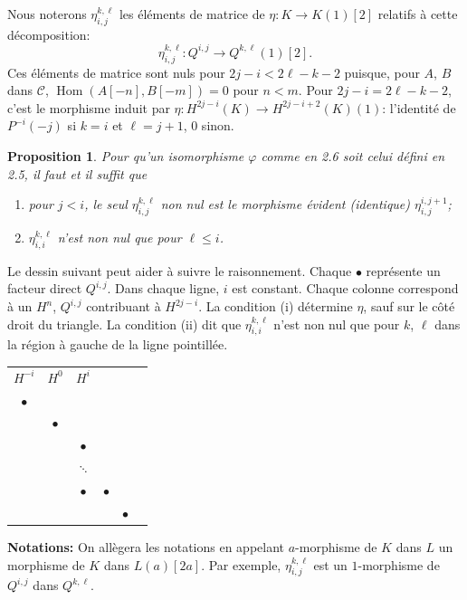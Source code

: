 \documentclass[11pt,a4paper]{article}
\theoremstyle{plain}
\newtheorem{proposition}[theorem]{Proposition}
\theoremstyle{definition}
\DeclareMathOperator{\Hom}{Hom}
\newcommand{\cC}{\mathscr{C}}
\begin{document}
Nous noterons $\eta^{k,\ell}_{i,j}$ les \'el\'ements de matrice de $\eta \colon K \to K(1)[2]$ relatifs \`a cette d\'ecomposition:
\[
\eta^{k,\ell}_{i,j} \colon Q^{i,j} \to Q^{k,\ell}(1)[2].
\]
Ces \'el\'ements de matrice sont nuls pour $2j-i < 2\ell-k-2$ puisque, pour $A$, $B$ dans $\cC$, $\Hom(A[-n], B[-m]) = 0$ pour $n < m$. Pour $2j-i = 2\ell-k-2$, c'est le morphisme induit par $\eta \colon H^{2j-i}(K) \to H^{2j-i+2}(K)(1)$: l'identit\'e de $P^{-i}(-j)$ si $k=i$ et $\ell=j+1$, $0$ sinon.

\begin{proposition}\label{prop:2.7}
Pour qu'un isomorphisme $\varphi$ comme en \emph{2.6} soit celui d\'efini en \emph{2.5}, il faut et il suffit que
\begin{enumerate}[label=\textup{(\roman*)}]
\item pour $j < i$, le seul $\eta^{k,\ell}_{i,j}$ non nul est le morphisme \'evident (identique) $\eta^{i,j+1}_{i,j}$;
\item $\eta^{k,\ell}_{i,i}$ n'est non nul que pour $\ell \leqslant i$.
\end{enumerate}
\end{proposition}

Le dessin suivant peut aider \`a suivre le raisonnement. Chaque $\bullet$ repr\'esente un facteur direct $Q^{i,j}$. Dans chaque ligne, $i$ est constant. Chaque colonne correspond \`a un $H^n$, $Q^{i,j}$ contribuant \`a $H^{2j-i}$. La condition (i) d\'etermine $\eta$, sauf sur le c\^ot\'e droit du triangle. La condition (ii) dit que $\eta^{k,\ell}_{i,i}$ n'est non nul que pour $k$, $\ell$ dans la r\'egion \`a gauche de la ligne pointill\'ee.

\begin{center}
\begin{tabular}{cccccc}
$H^{-i}$ & $H^0$ & $H^i$ & & & \\[4pt]
$\bullet$ & & & & & \\[-2pt]
& $\bullet$ & & & & \\[-2pt]
& & $\bullet$ & & & \\[-2pt]
& & $\ddots$ & & & \\[-2pt]
& & $\bullet$ & $\bullet$ & & \\[-2pt]
& & & & $\bullet$ &
\end{tabular}
\end{center}

\medskip
\noindent\textbf{Notations:} On all\`egera les notations en appelant $a$-morphisme de $K$ dans $L$ un morphisme de $K$ dans $L(a)[2a]$. Par exemple, $\eta^{k,\ell}_{i,j}$ est un $1$-morphisme de $Q^{i,j}$ dans $Q^{k,\ell}$.
\end{document}
